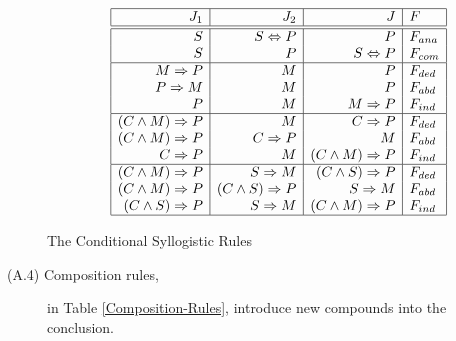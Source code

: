 \begin{description}
\begin{table}[htb]
\[\begin{array}{|r|r|r|l|} \hline
J_1 & J_2 & J & F \\
\hline \hline
S & S \Leftrightarrow P & P & F_{ana} \\
S & P	& S \Leftrightarrow P & F_{com} \\
\hline
M \Rightarrow P & M & P & F_{ded} \\
P \Rightarrow M & M & P & F_{abd} \\
P & M	& M \Rightarrow P & F_{ind} \\
\hline
(C \wedge M) \Rightarrow P & M & C \Rightarrow P & F_{ded} \\
(C \wedge M) \Rightarrow P & C \Rightarrow P & M & F_{abd} \\
C \Rightarrow P & M & (C \wedge M) \Rightarrow P & F_{ind} \\
\hline
(C \wedge M) \Rightarrow P & S \Rightarrow M & (C \wedge S) \Rightarrow P & F_{ded} \\
(C \wedge M) \Rightarrow P & (C \wedge S) \Rightarrow P & S \Rightarrow M & F_{abd} \\
(C \wedge S) \Rightarrow P & S \Rightarrow M & (C \wedge M) \Rightarrow P & F_{ind} \\
\hline \end{array}\]
\caption{The Conditional Syllogistic Rules}
\label{Conditional-Syllogism}
\end{table}

  \item[(A.4) Composition rules,] in Table \ref{Composition-Rules}, introduce new compounds into the conclusion.


\end{description}
